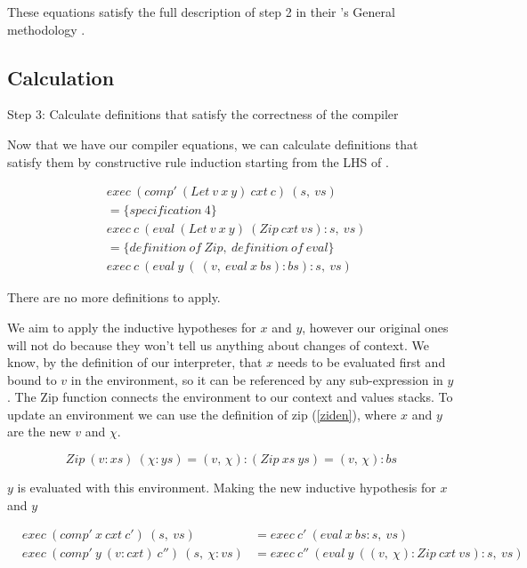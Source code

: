 \documentclass {article}
\begin{document}
These equations satisfy the full description
of step 2 in their \BH's General methodology
\cite[page 42]{bandh}.


\subsection{Calculation}

Step 3: Calculate definitions that satisfy
	the correctness of the compiler

Now that we have our compiler equations,
we can calculate definitions that satisfy
them by constructive rule induction
starting from the LHS of \cite[page 42]{bandh}.

\begin{align*}
	&exec\ (comp'\ (Let\ v\ x\ y)\ cxt\ c)\ (s,\ vs) \\
	&= \{ specification\ 4 \} \\
	&exec\ c\ (eval\ (Let\ v\ x\ y)\ (Zip\ cxt\ vs):s,\ vs) \\
	&= \{definition\ of\ Zip,\ definition\ of\ eval\} \\
	&exec\ c\ (eval\ y\ (\ (v,\ eval\ x\ bs) :bs) : s,\ vs)
\end{align*}

There are no more definitions to apply.

We aim to apply the inductive 
hypotheses for $x$ and $y$,
however our original ones will 
not do because they won't tell us
anything about changes of context.
We know, by the definition of our interpreter,
that $x$ needs to be evaluated first and 
bound to $v$ in the environment, so it can be 
referenced by any sub-expression
in $y$.
The Zip function connects the environment
to our context and values stacks.
To update an environment
we can use the definition of zip (\ref{ziden}),
where $x$ and $y$ are the new $v$ and $\chi$.

\[ Zip\ (v:xs)\ (\chi:ys) = (v,\, \chi):(Zip\ xs\ ys) = (v,\, \chi):bs \]

$y$ is evaluated with this environment.
Making the new inductive hypothesis for $x$ and $y$

\begin{eqnarray*}
	&exec\ (comp'\ x\ cxt\ c')\ (s,\ vs)
		&= exec\ c'\ (eval\ x\ bs : s,\ vs)\\
	&exec\ (comp'\ y\ (v:cxt)\ c'')\ (s,\ \chi : vs) 
		&= exec\ c''\ (eval\ y\ 
					(
					(v,\ \chi) : Zip\ cxt\ vs) : s,\ vs
					)\\
\end{eqnarray*}
\end{document}
